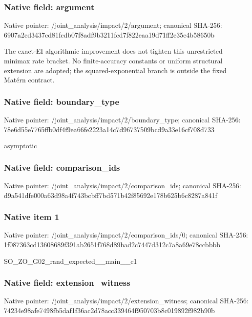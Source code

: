 \documentclass[10pt,a4paper]{article}
\begin{document}
\subsubsection{Native field: argument}
Native pointer: /joint\_\allowbreak{}analysis/impact/2/argument; canonical SHA-256: 6907a2cd3437cd81fcdb07f8adf9b3211fcd7f822eaa19d71ff2e35e4b58650b

\begingroup\raggedright\sloppy The exact-EI algorithmic improvement does not tighten this unrestricted minimax rate bracket. No finite-accuracy constants or uniform structural extension are adopted;\allowbreak{} the squared-exponential branch is outside the fixed Mat{\AtlasUnicodeText é}\allowbreak{}rn contract.\par\endgroup

\subsubsection{Native field: boundary\_\allowbreak{}type}
Native pointer: /joint\_\allowbreak{}analysis/impact/2/boundary\_\allowbreak{}type; canonical SHA-256: 78e6d55e7765ffb0df4f9ea66fe2223a14c7d96737509bcd9a33e16cf708d733

\begingroup\raggedright\sloppy asymptotic\par\endgroup

\subsubsection{Native field: comparison\_\allowbreak{}ids}
Native pointer: /joint\_\allowbreak{}analysis/impact/2/comparison\_\allowbreak{}ids; canonical SHA-256: d9a541dfe000a63d98a4f743bcbff7bd571b42f85692e178b625b6c8287a841f

\subsubsection{Native item 1}
Native pointer: /joint\_\allowbreak{}analysis/impact/2/comparison\_\allowbreak{}ids/0; canonical SHA-256: 1f087363cd13608689f391ab2651f768d89bad2c7447d312c7a8a69e78ccbbbb

\begingroup\raggedright\sloppy SO\_\allowbreak{}ZO\_\allowbreak{}G02\_\allowbreak{}rand\_\allowbreak{}expected\_\allowbreak{}\_\allowbreak{}main\_\allowbreak{}\_\allowbreak{}c1\par\endgroup

\subsubsection{Native field: extension\_\allowbreak{}witness}
Native pointer: /joint\_\allowbreak{}analysis/impact/2/extension\_\allowbreak{}witness; canonical SHA-256: 74234e98afe7498fb5daf1f36ac2d78acc339464f950703b8c019892f982b90b
\end{document}
